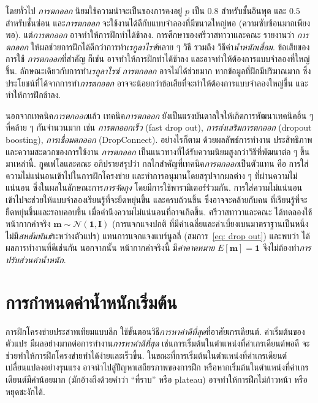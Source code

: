 โดยทั่วไป \textit{การตกออก}
นิยมใช้ความน่าจะเป็นของการคงอยู่ $p$ เป็น $0.8$ สำหรับชั้นอินพุต และ $0.5$ สำหรับชั้นซ่อน
และ\textit{การตกออก} จะใช้งานได้ดีกับแบบจำลองที่มีขนาดใหญ่พอ (ความซับซ้อนมากเพียงพอ).
แต่\textit{การตกออก} อาจทำให้การฝึกทำได้ช้าลง.
การศึกษาของศรีวาสทาวาและคณะ\cite{srivastavaEtAl2014a}
รายงานว่า \textit{การตกออก} ให้ผลช่วยการฝึกได้ดีกว่าการทำ\textit{เรกูลาไรซ์}หลาย ๆ วิธี รวมถึง วิธีค่า\textit{น้ำหนักเสื่อม}.
ข้อเสียของการใช้ \textit{การตกออก}ที่สำคัญ
ก็เช่น\cite{GoodfellowEtAl2016} อาจทำให้การฝึกทำได้ช้าลง และอาจทำให้ต้องการแบบจำลองที่ใหญ่ขึ้น.
ลักษณะเดียวกับการทำ\textit{เรกูลาไรซ์}
\textit{การตกออก} อาจไม่ได้ช่วยมาก หากข้อมูลที่ฝึกมีปริมาณมาก
ซึ่งประโยชน์ที่ได้จากการทำ\textit{การตกออก} อาจจะน้อยกว่าข้อเสียที่จะทำให้ต้องการแบบจำลองใหญ่ขึ้น
และทำให้การฝึกช้าลง.

นอกจากเทคนิค\textit{การตกออก}แล้ว
เทคนิค\textit{การตกออก} ยังเป็นแรงบันดาลใจให้เกิดการพัฒนาเทคนิคอื่น ๆ ที่คล้าย ๆ กันจำนวนมาก
เช่น \textit{การตกออกเร็ว} (fast drop out\cite{WangManning2013a}),
\textit{การส่งเสริมการตกออก} (dropout boosting\cite{Warde-FarleyEtAl2014a}),
\textit{การเชื่อมตกออก} (DropConnect\cite{WanEtAl2013a}).
อย่างไรก็ตาม ด้วยผลลัพธ์การทำงาน ประสิทธิภาพ และความสะดวกของการใช้งาน
\textit{การตกออก} เป็นแนวทางที่ได้รับความนิยมสูงกว่าวิธีที่พัฒนาต่อ ๆ ขึ้นมาเหล่านี้.
กูดเฟโลและคณะ\cite{GoodfellowEtAl2016} 
อภิปรายสรุปว่า กลไกสำคัญที่เทคนิค\textit{การตกออก}เป็นตัวแทน
คือ การใส่ความไม่แน่นอนเข้าไปในการฝึกโครงข่าย
และทำการอนุมานโดยสรุปจากผลต่าง ๆ ที่ผ่านความไม่แน่นอน
ซึ่งในผลในลักษณะการ\textit{การจัดถุง} โดยมีการใช้พารามิเตอร์ร่วมกัน.
การใส่ความไม่แน่นอน เข้าไปจะช่วยให้แบบจำลองเรียนรู้ที่จะยืดหยุ่นขึ้น และครบถ้วนขึ้น
ซึ่งอาจจะคล้ายกับคน ที่เรียนรู้ที่จะยืดหยุ่นขึ้นและรอบคอบขึ้น เมื่อคำนึงความไม่แน่นอนที่อาจเกิดขึ้น.
ศรีวาสทาวาและคณะ\cite{srivastavaEtAl2014a}
ได้ทดลองใช้หน้ากากค่าจริง $\bm{m} \sim \mathcal{N}(\bm{1}, \bm{I})$ (การแจกแจงปกติ ที่มีค่าเฉลี่ยและค่าเบี่ยงเบนมาตราฐานเป็นหนึ่ง ไม่มี\textit{สหสัมพันธ์}ระหว่างตัวแปร)
แทนการแจกแจงแบร์นูลลี่ (สมการ~\ref{eq: drop out})
และพบว่า ได้ผลการทำงานที่ดีเช่นกัน
นอกจากนั้น หน้ากากค่าจริงนี้ มี\textit{ค่าคาดหมาย} $E[\bm{m}] = \bm{1}$
จึงไม่ต้องทำ\textit{การปรับส่วนค่าน้ำหนัก}.

\section{การกำหนดค่าน้ำหนักเริ่มต้น}
\label{sec: weight init}

การฝึกโครงข่ายประสาทเทียมแบบลึก
ใช้ขั้นตอนวิธี\textit{การหาค่าดีที่สุด}ที่อาศัยเกรเดียนต์.
ค่าเริ่มต้นของตัวแปร 
มีผลอย่างมากต่อการทำงาน\textit{การหาค่าดีที่สุด} 
เช่นการเริ่มต้นในตำแหน่งที่ค่าเกรเดียนต์พอดี จะช่วยทำให้การฝึกโครงข่ายทำได้ง่ายและเร็วขึ้น.
ในขณะที่การเริ่มต้นในตำแหน่งที่ค่าเกรเดียนต์เปลี่ยนแปลงอย่างรุนแรง อาจนำไปสู่ปัญหาเสถียรภาพของการฝึก
หรือหากเริ่มต้นในตำแหน่งที่ค่าเกรเดียนต์มีค่าน้อยมาก 
(มักอ้างถึงด้วยคำว่า ``ที่ราบ'' หรือ plateau)
อาจทำให้การฝึกไม่ก้าวหน้า หรือหยุดชะงักได้.

